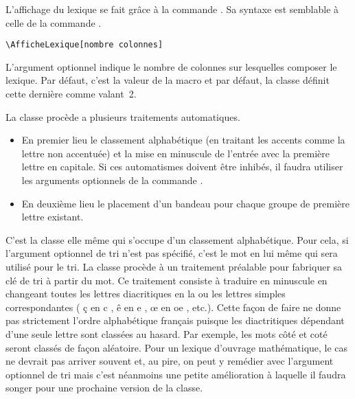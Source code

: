 \documentclass[nocrop]{sesamanuel}
\begin{document}
\begingroup
\def\clearpage{\par\goodbreak\hrulefill\par\vspace{2cm}}
\def\pagestyle#1{}
\def\thispagestyle#1{}
\AfficheLexique
\par\hrulefill\par
\endgroup
\vfill \clearpage
L'affichage du lexique se fait grâce à la commande
. Sa syntaxe est semblable à celle de la commande
.
\begin{syntaxe}
\begin{verbatim}
\AfficheLexique[nombre colonnes]
\end{verbatim}
L'argument optionnel indique le nombre de colonnes sur lesquelles
composer le lexique. Par défaut, c'est la valeur de
la macro  et par défaut, la classe définit
cette dernière comme valant~2.
\end{syntaxe}

\begin{remarque}
La classe procède a plusieurs traitements automatiques. 
\begin{itemize}
 \item 
 En premier lieu
le classement alphabétique (en traitant les accents comme la lettre
non accentuée) et la mise en minuscule de l'entrée avec la première
lettre en capitale. Si ces automatismes doivent être inhibés, il
faudra utiliser les arguments optionnels de la commande
. 
\item En deuxième lieu le placement d'un bandeau pour
chaque groupe de première lettre existant.
\end{itemize}

C'est la classe elle même qui s'occupe d'un classement
alphabétique. Pour cela, si l'argument optionnel de tri n'est pas
spécifié, c'est le mot en lui même qui sera utilisé pour le tri. La
classe procède à un traitement préalable pour fabriquer sa clé de tri
à partir du mot. Ce traitement consiste à traduire en minuscule en
changeant toutes les lettres diacritiques en la ou les lettres simples
correspondantes ( \og ç \fg{} en \og c \fg{}, \og ê \fg{} en \og e
\fg{}, \og œ \fg{} en \og oe \fg{}, etc.). Cette façon de faire ne
donne pas strictement l'ordre alphabétique français puisque les
diactritiques dépendant d'une seule lettre sont classées au
hasard. Par exemple, les mots \og côté \fg{} et \og coté \fg{} seront
classés de façon aléatoire. Pour un lexique d'ouvrage mathématique, le
cas ne devrait pas arriver souvent et, au pire, on peut y remédier
avec l'argument optionnel de tri mais c'est néanmoins une petite
amélioration à laquelle il faudra songer pour une prochaine version de
la classe.
\end{remarque}
\end{document}
